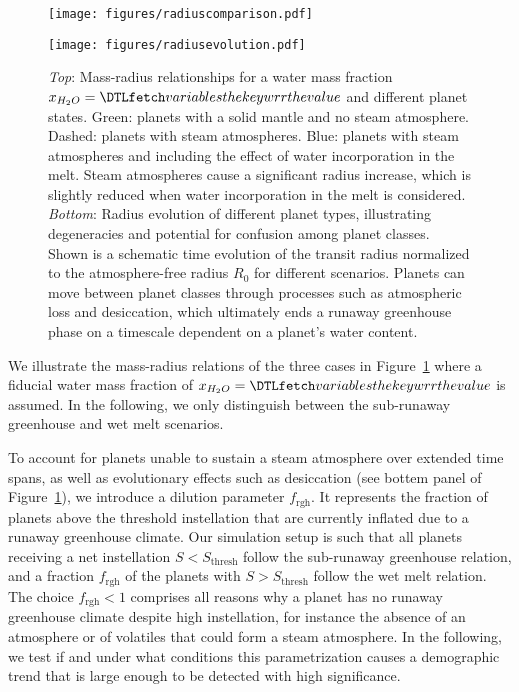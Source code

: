 \documentclass[twocolumn,twocolappendix]{aastex631}
\begin{document}
\begin{figure}
    \begin{centering}
        \texttt{[image: figures/radiuscomparison.pdf]}
    \end{centering}
    \begin{centering}
        \texttt{[image: figures/radiusevolution.pdf]}
        \caption{
            \textit{Top}: Mass-radius relationships for a water mass fraction $x_{H_2O}= \var{wrr}$ and different planet states. Green: planets with a solid mantle and no steam atmosphere. Dashed: planets with steam atmospheres. Blue: planets with steam atmospheres and including the effect of water incorporation in the melt.
                Steam atmospheres cause a significant radius increase, which is slightly reduced when water incorporation in the melt is considered.
            \textit{Bottom}: Radius evolution of different planet types, illustrating degeneracies and potential for confusion among planet classes. Shown is a schematic time evolution of the transit radius normalized to the atmosphere-free radius $R_\mathrm{0}$ for different scenarios. Planets can move between planet classes through processes such as atmospheric loss and desiccation, which ultimately ends a runaway greenhouse phase on a timescale dependent on a planet's water content.}
        \label{fig:radiusevolution}
    \end{centering}
\end{figure}
We illustrate the mass-radius relations of the three cases in Figure~\ref{fig:radiusevolution} where a fiducial water mass fraction of $x_{H_2O}= \var{wrr}$ is assumed. %
In the following, we only distinguish between the sub-runaway greenhouse and wet melt scenarios.

To account for planets unable to sustain a steam atmosphere over extended time spans, as well as evolutionary effects such as desiccation (see bottem panel of Figure~\ref{fig:radiusevolution}), we introduce a dilution parameter $f_\mathrm{rgh}$.
It represents the fraction of planets above the threshold instellation that are currently inflated due to a runaway greenhouse climate.
Our simulation setup is such that all planets receiving a net instellation $S < S_\mathrm{thresh}$ follow the sub-runaway greenhouse relation, and a fraction $f_\mathrm{rgh}$ of the planets with $S > S_\mathrm{thresh}$ follow the wet melt relation.
The choice $f_\mathrm{rgh} < 1$ comprises all reasons why a planet has no runaway greenhouse climate despite high instellation, for instance the absence of an atmosphere or of volatiles that could form a steam atmosphere.
In the following, we test if and under what conditions this parametrization causes a demographic trend that is large enough to be detected with high significance.
\end{document}
